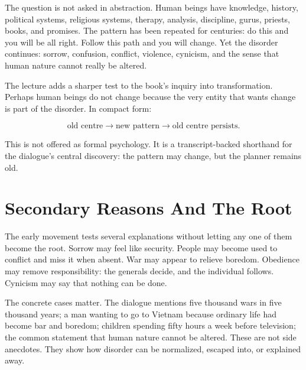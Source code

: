 \documentclass[11pt,oneside]{book}
\begin{document}
The question is not asked in abstraction. Human beings have knowledge, history, political systems, religious systems, therapy, analysis, discipline, gurus, priests, books, and promises. The pattern has been repeated for centuries: do this and you will be all right. Follow this path and you will change. Yet the disorder continues: sorrow, confusion, conflict, violence, cynicism, and the sense that human nature cannot really be altered.

The lecture adds a sharper test to the book's inquiry into transformation. Perhaps human beings do not change because the very entity that wants change is part of the disorder. In compact form:

\begin{equation}
\text{old centre}
\longrightarrow
\text{new pattern}
\longrightarrow
\text{old centre persists}.
\end{equation}

This is not offered as formal psychology. It is a transcript-backed shorthand for the dialogue's central discovery: the pattern may change, but the planner remains old.

\section{Secondary Reasons And The Root}

The early movement tests several explanations without letting any one of them become the root. Sorrow may feel like security. People may become used to conflict and miss it when absent. War may appear to relieve boredom. Obedience may remove responsibility: the generals decide, and the individual follows. Cynicism may say that nothing can be done.

The concrete cases matter. The dialogue mentions five thousand wars in five thousand years; a man wanting to go to Vietnam because ordinary life had become bar and boredom; children spending fifty hours a week before television; the common statement that human nature cannot be altered. These are not side anecdotes. They show how disorder can be normalized, escaped into, or explained away.
\end{document}
